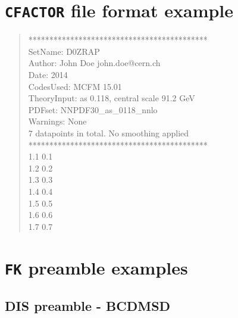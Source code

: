 \documentclass[11pt]{article}
\begin{document}
\section{{\tt CFACTOR} file format example} \label{app:CFACexa}
\begin{quotation}\noindent
*******************************************\\
SetName: D0ZRAP\\
Author: John Doe john.doe@cern.ch \\
Date: 2014\\
CodesUsed: MCFM 15.01\\
TheoryInput: as 0.118, central scale 91.2 GeV\\
PDFset: NNPDF30\_as\_0118\_nnlo\\
Warnings: None\\
7 datapoints in total. 
No smoothing applied\\
*******************************************\\
 1.1 0.1\\
 1.2 0.2\\
 1.3 0.3\\
 1.4 0.4\\
 1.5 0.5\\
 1.6 0.6\\
 1.7 0.7 \\
\end{quotation}
\clearpage
\section{{\tt FK} preamble examples} \label{app:FKheaders}
\subsection{DIS preamble - BCDMSD}
\end{document}
